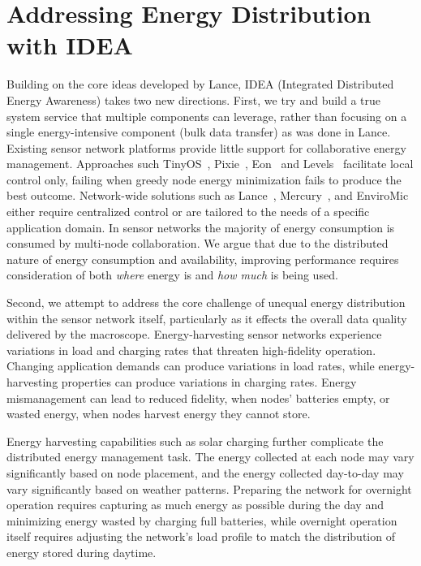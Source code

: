 \chapter{Addressing Energy Distribution with IDEA}
\label{chapter-idea}

Building on the core ideas developed by Lance, IDEA (Integrated Distributed
Energy Awareness) takes two new directions.  First, we try and build a true
system service that multiple components can leverage, rather than focusing on
a single energy-intensive component (bulk data transfer) as was done in
Lance.  Existing sensor network platforms provide little support for
collaborative energy management. Approaches such
TinyOS~\cite{tinyos-asplos00}, Pixie~\cite{pixie-sensys08},
Eon~\cite{eon-sensys07} and Levels~\cite{levels-sensys07} facilitate local
control only, failing when greedy node energy minimization fails to produce
the best outcome.  Network-wide solutions such as
Lance~\cite{lance-sensys08}, Mercury~\cite{parkinsons-embs07}, and
EnviroMic~\cite{enviromic} either require centralized control or are tailored
to the needs of a specific application domain. In sensor networks the
majority of energy consumption is consumed by multi-node collaboration. We
argue that due to the distributed nature of energy consumption and
availability, improving performance requires consideration of both
\textit{where} energy is and \textit{how much} is being used.

Second, we attempt to address the core challenge of unequal energy
distribution within the sensor network itself, particularly as it effects the
overall data quality delivered by the macroscope.  Energy-harvesting sensor
networks experience variations in load and charging rates that threaten
high-fidelity operation. Changing application demands can produce variations
in load rates, while energy-harvesting properties can produce variations in
charging rates. Energy mismanagement can lead to reduced fidelity, when
nodes' batteries empty, or wasted energy, when nodes harvest energy they
cannot store.

Energy harvesting capabilities such as solar charging further complicate the
distributed energy management task. The energy collected at each node may
vary significantly based on node placement, and the energy collected
day-to-day may vary significantly based on weather patterns. Preparing the
network for overnight operation requires capturing as much energy as possible
during the day and minimizing energy wasted by charging full batteries, while
overnight operation itself requires adjusting the network's load profile to
match the distribution of energy stored during daytime.

